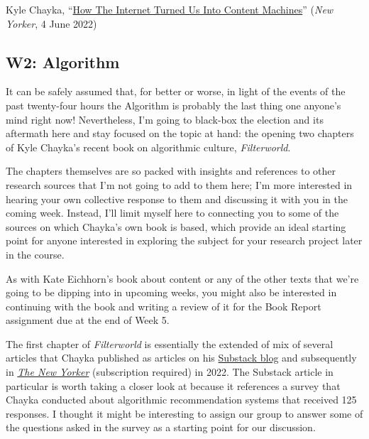 \documentclass[
  letterpaper,
  DIV=11,
  numbers=noendperiod,
  oneside]{scrartcl}
\author{}
\date{}
\begin{document}
\pagestyle{mystyle}


Kyle Chayka,
``\href{https://www.newyorker.com/culture/infinite-scroll/how-the-internet-turned-us-into-content-machines}{How
The Internet Turned Us Into Content Machines}'' (\emph{New Yorker}, 4
June 2022)

\subsection{W2: Algorithm}\label{w2-algorithm}

{}

It can be safely assumed that, for better or worse, in light of the
events of the past twenty-four hours the Algorithm is probably the last
thing one anyone's mind right now! Nevertheless, I'm going to black-box
the election and its aftermath here and stay focused on the topic at
hand: the opening two chapters of Kyle Chayka's recent book on
algorithmic culture, \emph{Filterworld}.

The chapters themselves are so packed with insights and references to
other research sources that I'm not going to add to them here; I'm more
interested in hearing your own collective response to them and
discussing it with you in the coming week. Instead, I'll limit myself
here to connecting you to some of the sources on which Chayka's own book
is based, which provide an ideal starting point for anyone interested in
exploring the subject for your research project later in the course.

As with Kate Eichhorn's book about content or any of the other texts
that we're going to be dipping into in upcoming weeks, you might also be
interested in continuing with the book and writing a review of it for
the Book Report assignment due at the end of Week 5.

The first chapter of \emph{Filterworld} is essentially the extended of
mix of several articles that Chayka published as articles on his
\href{https://kylechayka.substack.com/p/on-algorithmic-anxiety}{Substack
blog} and subsequently in
\href{https://www.newyorker.com/culture/infinite-scroll/the-age-of-algorithmic-anxiety}{\emph{The
New Yorker}} (subscription required) in 2022. The Substack article in
particular is worth taking a closer look at because it references a
survey that Chayka conducted about algorithmic recommendation systems
that received 125 responses. I thought it might be interesting to assign
our group to answer some of the questions asked in the survey as a
starting point for our discussion.
\end{document}
